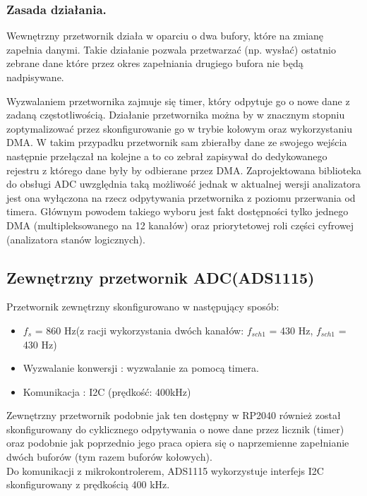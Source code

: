 \subsubsection{Zasada działania.}
    Wewnętrzny przetwornik działa w oparciu o dwa bufory, które na zmianę zapełnia danymi. Takie 
    działanie pozwala przetwarzać (np. wysłać) ostatnio zebrane dane które przez okres 
    zapełniania drugiego bufora nie będą nadpisywane.

    Wyzwalaniem przetwornika zajmuje się timer, który odpytuje go o nowe dane z zadaną częstotliwością.
    Działanie przetwornika można by w znacznym stopniu zoptymalizować przez skonfigurowanie go w trybie kołowym oraz wykorzystaniu DMA. 
    W takim przypadku przetwornik sam zbierałby dane ze swojego wejścia następnie przełączał na kolejne a to co zebrał zapisywał do dedykowanego rejestru z którego dane były by odbierane przez DMA.
    Zaprojektowana biblioteka do obsługi ADC uwzględnia taką możliwość jednak w aktualnej wersji analizatora jest ona wyłączona na rzecz odpytywania przetwornika z poziomu przerwania od timera. 
    Głównym powodem takiego wyboru jest fakt dostępności tylko jednego DMA (multipleksowanego na 12 kanałów) oraz priorytetowej roli części cyfrowej (analizatora stanów logicznych).


\subsection{Zewnętrzny przetwornik ADC(ADS1115)}
Przetwornik zewnętrzny skonfigurowano w następujący sposób:
\begin{itemize}
    \item $f_{s}$ = 860 Hz(z racji wykorzystania dwóch kanałów: $f_{sch1}$ = 430 Hz, $f_{sch1}$ = 430 Hz)
    \item Wyzwalanie konwersji : wyzwalanie za pomocą timera. 
    \item Komunikacja : I2C (prędkość: 400kHz)
\end{itemize}

Zewnętrzny przetwornik podobnie jak ten dostępny w RP2040 również został skonfigurowany do cyklicznego odpytywania o nowe dane przez licznik (timer) oraz podobnie jak poprzednio jego praca opiera się o naprzemienne zapełnianie dwóch buforów (tym razem buforów kołowych). \\
Do komunikacji z mikrokontrolerem, ADS1115 wykorzystuje interfejs I2C skonfigurowany z prędkością 400 kHz.

